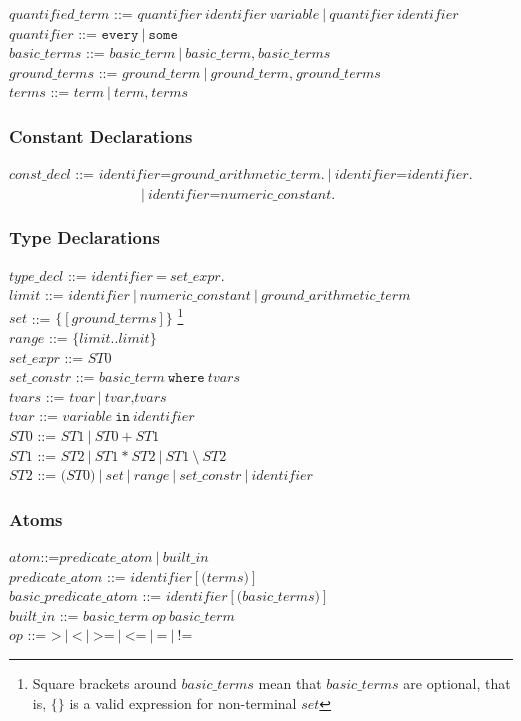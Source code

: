 \documentclass[a4paper,10pt]{article}
\begin{document}
\noindent
$quantified\_term$ ::= $quantifier~identifier~variable~|~quantifier~identifier$\\
$quantifier$ ::= $\texttt{every}~|~\texttt{some}$ \\
$basic\_terms$ ::= $basic\_term~|~basic\_term\texttt{,} ~basic\_terms$ \\
$ground\_terms$ ::= $ground\_term~|~ground\_term\texttt{,} ~ground\_terms$ \\
$terms$ ::= $term~|~term\texttt{,}~ terms$ \\

\subsubsection{Constant Declarations}
$const\_decl$ ::= $identifier \texttt{=} ground\_arithmetic\_term.~|~identifier \texttt{=} identifier.~$\\
~~~~~~~~~~$~~~~~~~~~~~~~~~~~~~~|~identifier \texttt{=} numeric\_constant.$
\subsubsection{Type Declarations}

$type\_decl$ ::= $identifier~ \texttt{=} ~set\_expr.$\\
$limit$ ::= $identifier~|~numeric\_constant~|~ground\_arithmetic\_term$\\
$set$ ::= $\texttt{\{} [ground\_terms] \texttt{\}}$ \footnote{Square brackets around $basic\_terms$ mean that $basic\_terms$ are optional, that is, $\{ \}$  is a valid expression for non-terminal $set$}\\
$range$ ::= $\texttt{\{}limit..limit\texttt{\}}$\\
$set\_expr$ ::= $ST0$ \\  
$set\_constr$ ::= $basic\_term~\texttt{where}~tvars $\\
$tvars$ ::= $tvar~|~tvar\texttt{,} tvars$\\
$tvar$ ::= $variable~\texttt{in}~identifier$  \\
$ST0$ ::= $ST1~|~ST0~\texttt{+}~ST1$\\
$ST1$ ::= $ST2~|~ST1~\texttt{*}~ST2~|~ST1~\texttt{\textbackslash}~ST2$ \\
$ST2$ ::= $\texttt{(}ST0\texttt{)}~|~set~|~range~|~set\_constr~|~identifier$  \\


\subsubsection{Atoms}
$atom$::=$predicate\_atom~|~built\_in $\\
$predicate\_atom$ ::= $identifier [\texttt{(} terms \texttt{)}]$\\
$basic\_predicate\_atom$ ::= $identifier [\texttt{(} basic\_terms \texttt{)}]$\\
$built\_in$ ::= $ basic\_term~op~basic\_term$\\
$op$ ::= $\texttt{>}~|~\texttt{<}~|~\texttt{>=}~|~\texttt{<=}~|~\texttt{=}~|~\texttt{!=}$ \\
\end{document}
